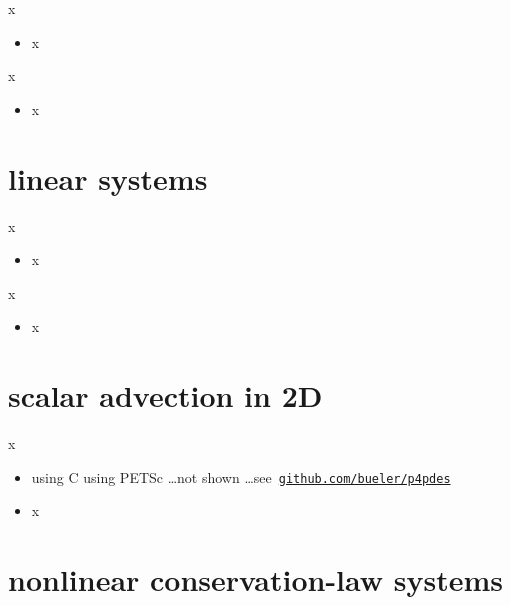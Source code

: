 \documentclass[10pt,hyperref]{beamer}
\begin{document}
\begin{frame}{x}

\begin{itemize}
\item x
\end{itemize}
\end{frame}


\begin{frame}{x}

\begin{itemize}
\item x
\end{itemize}
\end{frame}


\section{linear systems}

\begin{frame}{x}

\begin{itemize}
\item x
\end{itemize}
\end{frame}


\begin{frame}{x}

\begin{itemize}
\item x
\end{itemize}
\end{frame}



\section{scalar advection in 2D}

\begin{frame}{x}

\begin{itemize}
\item using C using PETSc \dots not shown \dots see \,\href{https://github.com/bueler/p4pdes}{\texttt{github.com/bueler/p4pdes}}
\item x
\end{itemize}
\end{frame}


\section{nonlinear conservation-law systems}
\end{document}
